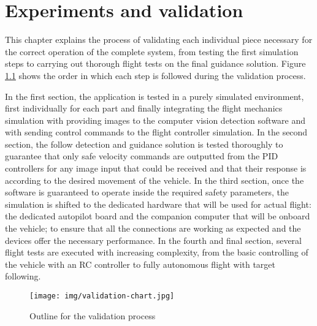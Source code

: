 \chapter{Experiments and validation}
\label{chap:validation}

This chapter explains the process of validating each individual piece necessary for the correct operation of the complete system, from testing the first simulation steps to carrying out thorough flight tests on the final guidance solution.
Figure \ref{fig:validation-chart} shows the order in which each step is followed during the validation process.

In the first section, the application is tested in a purely simulated environment, first individually for each part and finally integrating the flight mechanics simulation with providing images to the computer vision detection software and with sending control commands to the flight controller simulation.
In the second section, the follow detection and guidance solution is tested thoroughly to guarantee that only safe velocity commands are outputted from the PID controllers for any image input that could be received and that their response is according to the desired movement of the vehicle.
In the third section, once the software is guaranteed to operate inside the required safety parameters, the simulation is shifted to the dedicated hardware that will be used for actual flight: the dedicated autopilot board and the companion computer that will be onboard the vehicle; to ensure that all the connections are working as expected and the devices offer the necessary performance.
In the fourth and final section, several flight tests are executed with increasing complexity, from the basic controlling of the vehicle with an RC controller to fully autonomous flight with target following.

\begin{figure}
  \centering
  \texttt{[image: img/validation-chart.jpg]}
  \caption{Outline for the validation process}\label{fig:validation-chart}
\end{figure}






\clearpage